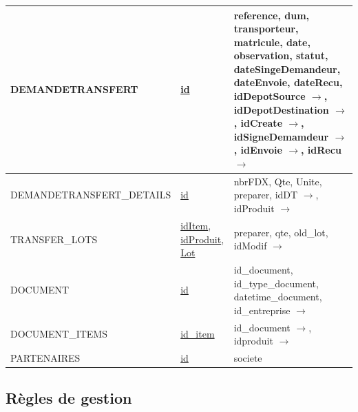 \documentclass[12pt,a4paper]{article}
\begin{document}
\begin{center}
\begin{tabular}{|p{3.2cm}|p{2cm}|p{8cm}|}
\hline
DEMANDETRANSFERT & \underline{id} & reference, dum, transporteur, matricule, date, observation, statut, dateSingeDemandeur, dateEnvoie, dateRecu, idDepotSource $\to$, idDepotDestination $\to$, idCreate $\to$, idSigneDemamdeur $\to$, idEnvoie $\to$, idRecu $\to$ \\
\hline
DEMANDETRANSFERT\_DETAILS & \underline{id} & nbrFDX, Qte, Unite, preparer, idDT $\to$, idProduit $\to$ \\
\hline
TRANSFER\_LOTS & \underline{idItem}, \underline{idProduit}, \underline{Lot} & preparer, qte, old\_lot, idModif $\to$ \\
\hline
DOCUMENT & \underline{id} & id\_document, id\_type\_document, datetime\_document, id\_entreprise $\to$ \\
\hline
DOCUMENT\_ITEMS & \underline{id\_item} & id\_document $\to$, idproduit $\to$ \\
\hline
PARTENAIRES & \underline{id} & societe \\
\hline
\end{tabular}
\end{center}

\subsection{Règles de gestion}
\end{document}

